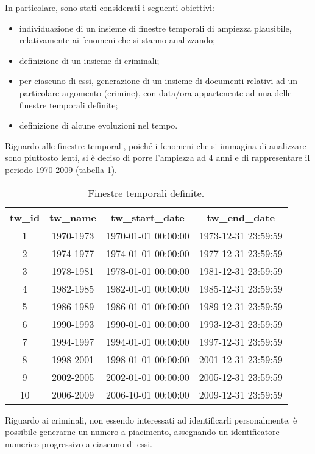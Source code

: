 In particolare, sono stati considerati i seguenti obiettivi:
\begin{itemize}
	\item individuazione di un insieme di finestre temporali di ampiezza plausibile, relativamente ai fenomeni che si stanno analizzando;
	\item definizione di un insieme di criminali;
	\item per ciascuno di essi, generazione di un insieme di documenti relativi ad un particolare argomento (crimine), con data/ora appartenente ad una delle finestre temporali definite;
	\item definizione di alcune evoluzioni nel tempo.
\end{itemize}

Riguardo alle finestre temporali, poiché i fenomeni che si immagina di analizzare sono piuttosto lenti, si è deciso di porre l'ampiezza ad 4 anni e di rappresentare il periodo 1970-2009 (tabella \ref{TAB_FinestreTemporali}).
\begin{table}[htb]
	\centering
	\footnotesize
	\begin{tabular}{|cccc|}
	\hline
	\textbf{tw\_id} & \textbf{tw\_name} & \textbf{tw\_start\_date} & \textbf{tw\_end\_date} \\ \hline
	1 & 1970-1973 & 1970-01-01 00:00:00 & 1973-12-31 23:59:59 \\
	2 & 1974-1977 & 1974-01-01 00:00:00 & 1977-12-31 23:59:59 \\
	3 & 1978-1981 & 1978-01-01 00:00:00 & 1981-12-31 23:59:59 \\
	4 & 1982-1985 & 1982-01-01 00:00:00 & 1985-12-31 23:59:59 \\
	5 & 1986-1989 & 1986-01-01 00:00:00 & 1989-12-31 23:59:59 \\
	6 & 1990-1993 & 1990-01-01 00:00:00 & 1993-12-31 23:59:59 \\
	7 & 1994-1997 & 1994-01-01 00:00:00 & 1997-12-31 23:59:59 \\
	8 & 1998-2001 & 1998-01-01 00:00:00 & 2001-12-31 23:59:59 \\
	9 & 2002-2005 & 2002-01-01 00:00:00 & 2005-12-31 23:59:59 \\
	10 & 2006-2009 & 2006-10-01 00:00:00 & 2009-12-31 23:59:59 \\
	\hline
	\end{tabular}
	\caption{Finestre temporali definite.}
	\label{TAB_FinestreTemporali}
\end{table}

Riguardo ai criminali, non essendo interessati ad identificarli personalmente, è possibile generarne un numero a piacimento, assegnando un identificatore numerico progressivo a ciascuno di essi.

